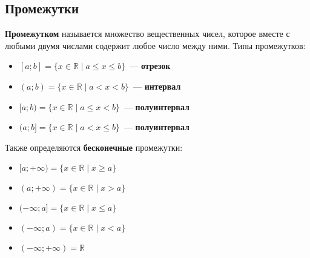 \subsection{Промежутки}
 \textbf{Промежутком} называется множество вещественных чисел, которое вместе с любыми двумя числами содержит любое число между ними.
Типы промежутков:
\begin{itemize}
	\item {} $[a; b] = \{ x \in \mathbb R \mid a \leqslant x \leqslant b \}$~--- \textbf{отрезок}
	\item {} $(a; b) = \{ x \in \mathbb R \mid a < x < b \}$~--- \textbf{интервал}
	\item $[a; b) = \{ x \in \mathbb R \mid a \leqslant x < b \}$~--- \textbf{полуинтервал}
	\item $(a; b] = \{ x \in \mathbb R \mid a < x \leqslant b \}$~--- \textbf{полуинтервал}
\end{itemize}

Также определяются \textbf{бесконечные} промежутки:
\begin{itemize}
	\item $[a; +\infty) = \{ x \in \mathbb R \mid x \geqslant a \}$
	\item $(a; +\infty) = \{ x \in \mathbb R \mid x > a \}$
	\item $(-\infty; a] = \{ x \in \mathbb R \mid x \leqslant a \}$
	\item $(-\infty; a) = \{ x \in \mathbb R \mid x < a \}$
	\item $(-\infty; +\infty) = \mathbb R$
\end{itemize}